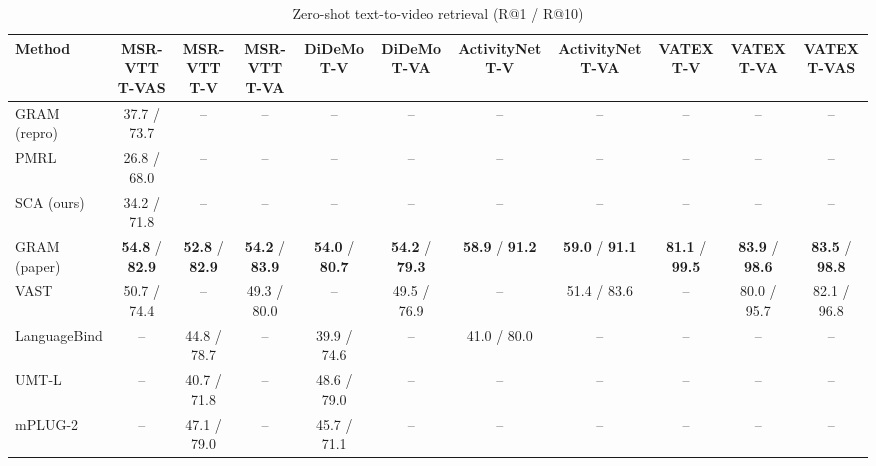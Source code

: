 \begin{table}[t]
\centering
\caption{Zero-shot text-to-video retrieval (R@1 / R@10)}
\label{tab:zeroshot_t2v}
\small
\begin{tabular}{lcccccccccc}
\toprule
Method & MSR-VTT T-VAS & MSR-VTT T-V & MSR-VTT T-VA & DiDeMo T-V & DiDeMo T-VA & ActivityNet T-V & ActivityNet T-VA & VATEX T-V & VATEX T-VA & VATEX T-VAS \\
\midrule
GRAM (repro) & 37.7 / 73.7 & -- & -- & -- & -- & -- & -- & -- & -- & -- \\
PMRL & 26.8 / 68.0 & -- & -- & -- & -- & -- & -- & -- & -- & -- \\
SCA (ours) & 34.2 / 71.8 & -- & -- & -- & -- & -- & -- & -- & -- & -- \\
GRAM (paper) & \textbf{54.8} / \textbf{82.9} & \textbf{52.8} / \textbf{82.9} & \textbf{54.2} / \textbf{83.9} & \textbf{54.0} / \textbf{80.7} & \textbf{54.2} / \textbf{79.3} & \textbf{58.9} / \textbf{91.2} & \textbf{59.0} / \textbf{91.1} & \textbf{81.1} / \textbf{99.5} & \textbf{83.9} / \textbf{98.6} & \textbf{83.5} / \textbf{98.8} \\
VAST & 50.7 / 74.4 & -- & 49.3 / 80.0 & -- & 49.5 / 76.9 & -- & 51.4 / 83.6 & -- & 80.0 / 95.7 & 82.1 / 96.8 \\
LanguageBind & -- & 44.8 / 78.7 & -- & 39.9 / 74.6 & -- & 41.0 / 80.0 & -- & -- & -- & -- \\
UMT-L & -- & 40.7 / 71.8 & -- & 48.6 / 79.0 & -- & -- & -- & -- & -- & -- \\
mPLUG-2 & -- & 47.1 / 79.0 & -- & 45.7 / 71.1 & -- & -- & -- & -- & -- & -- \\
\bottomrule
\end{tabular}
\end{table}
